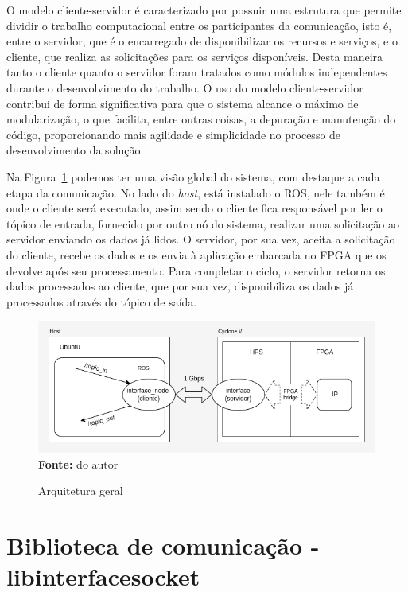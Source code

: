 O modelo cliente-servidor é caracterizado por possuir uma estrutura que permite dividir o trabalho computacional entre os participantes da comunicação, isto é, entre o servidor, que é o encarregado de disponibilizar os recursos e serviços, e o cliente, que realiza as solicitações para os serviços disponíveis.  Desta maneira tanto o cliente quanto o servidor foram tratados como módulos independentes durante o desenvolvimento do trabalho. O uso do modelo cliente-servidor contribui de forma significativa para que o sistema alcance o máximo de modularização, o que facilita, entre outras coisas, a depuração e manutenção do código, proporcionando mais agilidade e simplicidade no processo de desenvolvimento da solução.


Na Figura~\ref{fig:arquitetura} podemos ter uma visão global do sistema, com destaque a cada etapa da comunicação. No lado do \textit{host}, está instalado o ROS, nele também é onde o cliente será executado, assim sendo o cliente fica responsável por ler o tópico de entrada, fornecido por outro nó do sistema, realizar uma solicitação ao servidor enviando os dados já lidos. O servidor, por sua vez, aceita a solicitação do cliente, recebe os dados e os envia à aplicação embarcada no FPGA que os devolve após seu processamento. Para completar o ciclo, o servidor retorna os dados processados ao cliente, que por sua vez, disponibiliza os dados já processados através do tópico de saída. 

\begin{figure}[ht]
	\caption{Arquitetura geral}
	\begin{center}
		\includegraphics[scale=0.7]{imagens/arquitetura_geral.png}\\
		{\small \textbf{Fonte:} do autor}
    \end{center}\label{fig:arquitetura}
\end{figure}




\section{Biblioteca de comunicação - libinterfacesocket}

